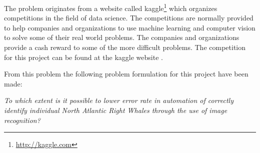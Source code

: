 The problem originates from a website called kaggle\footnote{\url{http://kaggle.com}} which organizes competitions in the field of data science. The competitions are normally provided to help companies and organizations to use machine learning and computer vision to solve some of their real world problems. The companies and organizations provide a cash reward to some of the more difficult problems. The competition for this project can be found at the kaggle website \cite{kaggle:competition}.

From this problem the following problem formulation for this project have been made:

\begin{center}
	\emph{To which extent is it possible to lower error rate in automation of correctly identify individual North Atlantic Right Whales through the use of image recognition?}
\end{center}